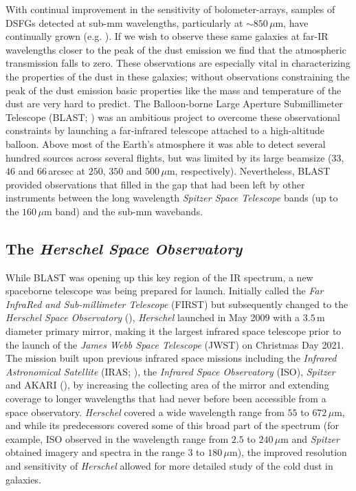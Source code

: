 With continual improvement in the sensitivity of bolometer-arrays, samples of DSFGs detected at sub-mm wavelengths, particularly at $\sim 850\,\mu$m, have continually grown (e.g. \citealt{Borys_2003, Coppin_2006, Weiss_2009, Casey_2013, Geach_2017}). If we wish to observe these same galaxies at far-IR wavelengths closer to the peak of the dust emission we find that the atmospheric transmission falls to zero. These observations are especially vital in characterizing the properties of the dust in these galaxies; without observations constraining the peak of the dust emission basic properties like the mass and temperature of the dust are very hard to predict. The Balloon-borne Large Aperture Submillimeter Telescope (BLAST; \citealt{Devlin_2009}) was an ambitious project to overcome these observational constraints by launching a far-infrared telescope attached to a high-altitude balloon. Above most of the Earth's atmosphere it was able to detect several hundred sources across several flights, but was limited by its large beamsize ($33$, $46$ and $66\,$arcsec at $250$, $350$ and $500\,\mu$m, respectively). Nevertheless, BLAST provided observations that filled in the gap that had been left by other instruments between the long wavelength \textit{Spitzer Space Telescope} bands (up to the $160\,\mu$m band) and the sub-mm wavebands.

\subsection{The \textit{Herschel Space Observatory}}

While BLAST was opening up this key region of the IR spectrum, a new spaceborne telescope was being prepared for launch. Initially called the \textit{Far InfraRed and Sub-millimeter Telescope} (FIRST) but subsequently changed to the \textit{Herschel Space Observatory} (\citealt{Pilbratt_2010}), \textit{Herschel} launched in May 2009 with a $3.5\,$m diameter primary mirror, making it the largest infrared space telescope prior to the launch of the \textit{James Webb Space Telescope} (JWST) on Christmas Day 2021. The mission built upon previous infrared space missions including the \textit{Infrared Astronomical Satellite} (IRAS; \citealt{Neugebauer_1984}), the \textit{Infrared Space Observatory} (ISO), \textit{Spitzer} and AKARI (\citealt{Murakami_2007}), by increasing the collecting area of the mirror and extending coverage to longer wavelengths that had never before been accessible from a space observatory. \textit{Herschel} covered a wide wavelength range from $55$ to $672\,\mu$m, and while its predecessors covered some of this broad part of the spectrum (for example, ISO observed in the wavelength range from $2.5$ to $240\,\mu$m and \textit{Spitzer} obtained imagery and spectra in the range $3$ to $180\,\mu$m), the improved resolution and sensitivity of \textit{Herschel} allowed for more detailed study of the cold dust in galaxies.

